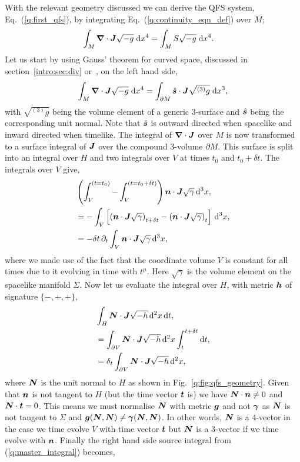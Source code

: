 With the relevant geometry discussed we can derive the QFS system, Eq.~(\ref{q:first_qfs}), by integrating Eq.~(\ref{q:continuity_eqn_def}) over $M$;
\begin{align} \label{q:master_integral}
\int_{M } \boldsymbol{\nabla}\cdot \boldsymbol{J} \sqrt{-g} \;\dd x^4 &= \int_{M } S \sqrt{-g} \;\dd x^4.
\end{align}
Let us start by using Gauss' theorem for curved space, discussed in section~\ref{intro:sec:div} or~\cite{baumgarte_shapiro_2010}, on the left hand side,
\begin{align} \label{q:master_gauss}
\int_{M } \boldsymbol{\nabla}\cdot \boldsymbol{J} \sqrt{-g}\;\dd x^4  = \int_{\partial M } \hat{\boldsymbol{s}} \cdot \boldsymbol{J} \sqrt{{}^{(3)}{g}} \;\dd x^3 ,
\end{align}
with $\sqrt{{}^{(3)}g}$ being the volume element of a generic 3-surface and $\hat{\boldsymbol{s}}$ being the corresponding unit normal. Note that $\hat{\boldsymbol s}$ is outward directed when spacelike and inward directed when timelike. The integral of  $\boldsymbol{\nabla} \cdot \boldsymbol{J}$ over $M$ is now transformed to a surface integral of $\boldsymbol{J}$ over the compound 3-volume $\partial M$. This surface is split into an integral over $H$ and two integrals over $V$ at times $t_0$ and $t_0 + \delta t$. The integrals over $V$ give,
\begin{align}
&\left(\int^{(t=t_0)}_{V} - \int^{(t=t_0+\delta t)}_{V} \right)\boldsymbol{n} \cdot \boldsymbol{J} \sqrt{\gamma} \,\dd^3 x ,\nonumber \\
&=-\int_{V}\left[\left(\boldsymbol{n} \cdot \boldsymbol{J} \sqrt{\gamma}\right)_{t+\delta t} - \left(\boldsymbol{n} \cdot \boldsymbol{J} \sqrt{\gamma}\right)_{t}\right] \,\dd^3 x, \\
\label{q:q_int}&=-\delta t\,\partial_t \int_{V} \boldsymbol{n} \cdot \boldsymbol{J} \sqrt{\gamma}\,\dd^3 x ,
\end{align}
where we made use of the fact that the coordinate volume $V$ is constant for all times due to it evolving in time with $t^\mu$. Here $\sqrt{\gamma}$ is the volume element on the spacelike manifold $\Sigma$. Now let us evaluate the integral over $H$, with metric $\boldsymbol{h}$ of signature $\{-,+,+\}$,
\begin{align}
&\int_{H} \boldsymbol{N} \cdot \boldsymbol{J} \sqrt{-h} \,\dd^2 x\,\dd t, \nonumber \\
&=\int_{\partial V}  \boldsymbol{N} \cdot \boldsymbol{J} \sqrt{-h} \,\dd^2 x\int_t^{t+\delta t}\dd t, \\
\label{q:f_int}&=\delta_t \int_{\partial V} \boldsymbol{N} \cdot \boldsymbol{J} \sqrt{-h} \,\dd^2 x,
\end{align}
where $\boldsymbol{N}$ is the unit normal to $H$ as shown in Fig.~\ref{q:fig:qfs_geometry}. Given that $\boldsymbol{n}$ is not tangent to $H$ (but the time vector $\boldsymbol{t}$ is) we have $\boldsymbol{N} \cdot \boldsymbol{n} \neq 0$ and $\boldsymbol{N} \cdot \boldsymbol{t} =0$. This means we must normalise $\boldsymbol{N}$ with metric $\boldsymbol{g}$ and not $\boldsymbol{\gamma}$ as $\boldsymbol{N}$ is not tangent to $\Sigma$ and $\boldsymbol{g}(\boldsymbol{N},\boldsymbol{N})\neq \boldsymbol{\gamma}(\boldsymbol{N},\boldsymbol{N})$. In other words, $\boldsymbol{N}$ is a 4-vector in the case we time evolve $V$ with time vector $\boldsymbol{t}$ but $\boldsymbol{N}$ is a 3-vector if we time evolve with $\boldsymbol{n}$. Finally the right hand side source integral from (\ref{q:master_integral}) becomes,
